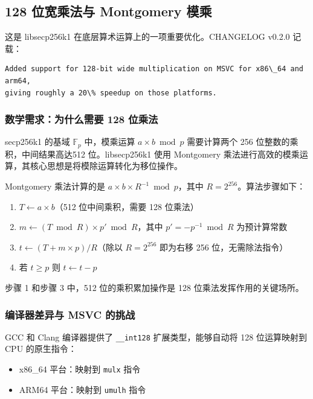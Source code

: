 \documentclass[a4paper,12pt]{ctexart}
\newcommand{\code}[1]{\texttt{#1}}
\begin{document}
\subsection{128 位宽乘法与 Montgomery 模乘}
这是 libsecp256k1 在底层算术运算上的一项重要优化。CHANGELOG v0.2.0 记载：
\begin{codebox}
\begin{verbatim}
Added support for 128-bit wide multiplication on MSVC for x86\_64 and arm64,
giving roughly a 20\% speedup on those platforms.
\end{verbatim}
\end{codebox}


\subsubsection{数学需求：为什么需要 128 位乘法}

secp256k1 的基域 $\mathbb{F}_p$ 中，模乘运算 $a \times b \bmod p$ 需要计算两个 256 位整数的乘积，中间结果高达512 位。libsecp256k1 使用 Montgomery 乘法进行高效的模乘运算，其核心思想是将模除运算转化为移位操作。

Montgomery 乘法计算的是 $a \times b \times R^{-1} \bmod p$，其中 $R = 2^{256}$。算法步骤如下：

\begin{enumerate}[leftmargin=*]
  \item $T \leftarrow a \times b$（512 位中间乘积，需要 128 位乘法）
  \item $m \leftarrow (T \bmod R) \times p' \bmod R$，其中 $p' = -p^{-1} \bmod R$ 为预计算常数
  \item $t \leftarrow (T + m \times p) / R$（除以 $R = 2^{256}$ 即为右移 256 位，无需除法指令）
  \item 若 $t \geq p$ 则 $t \leftarrow t - p$
\end{enumerate}

步骤 1 和步骤 3 中，512 位的乘积累加操作是 128 位乘法发挥作用的关键场所。

\subsubsection{编译器差异与 MSVC 的挑战}

GCC 和 Clang 编译器提供了 \code{\_\_int128} 扩展类型，能够自动将 128 位运算映射到 CPU 的原生指令：
\begin{itemize}[leftmargin=*]
  \item x86\_64 平台：映射到 \code{mulx} 指令
  \item ARM64 平台：映射到 \code{umulh} 指令
\end{itemize}
\end{document}
